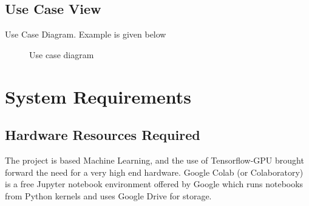 \documentclass[oneside,a4paper,12pt]{report}
\begin{document}
\subsection{Use Case View}
Use Case Diagram. Example is given below
\begin{center}
	\begin{figure}[!htbp]
		\centering
	  \caption{Use case diagram}
	  \label{fig:usecase_dig}
	\end{figure}
\end{center}

\section{System Requirements}
\subsection{Hardware Resources Required}
\hspace*{0.25 in}The project is based Machine Learning, and the use of Tensorflow-GPU brought forward the need for a very high end hardware. Google Colab (or Colaboratory) is a free Jupyter notebook environment offered by Google which runs notebooks from Python kernels and uses Google Drive for storage.

\end{document}
